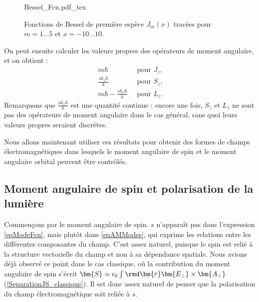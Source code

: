 \begin{figure}[!ht]
\centering
\def\svgwidth{0.8\columnwidth}
{Bessel_Fcn.pdf_tex}
\caption{Fonctions de Bessel de première espèce $J_m(x)$ tracées pour $m=1\ldots5$ et $x=-10\ldots10$.}
\label{Fig:BesselFcn}
\end{figure}

On peut ensuite calculer les valeurs propres des opérateurs de moment angulaire, et on obtient :
\begin{equation}
\begin{alignedat}{1}
m\hbar ~&\mbox{ pour } J_z\mbox{,}\\
\frac{sk_z\hbar}{k} ~&\mbox{ pour } S_z\mbox{,}\\
m\hbar-\frac{sk_z\hbar}{k} ~&\mbox{ pour } L_z\mbox{.}
\end{alignedat}
\label{eq.VP_AM}
\end{equation}
Remarquons que $\frac{sk_z\hbar}{k}$ est une quantité continue : encore une fois, $S_z$ et $L_z$ ne sont pas des opérateurs de moment angulaire dans le cas général, sans quoi leurs valeurs propres seraient discrètes. 


Nous allons maintenant utiliser ces résultats pour obtenir des formes de champs électromagnétiques dans lesquels le moment angulaire de spin et le moment angulaire orbital peuvent être contrôlés.

\subsection{Moment angulaire de spin et polarisation de la lumière}
Commençons par le moment angulaire de spin. $s$ n'apparaît pas dans l'expression \ref{eqModeFcn}, mais plutôt dans \ref{eqAMModes}, qui exprime les relations entre les différentes composantes du champ. C'est assez naturel, puisque le spin est relié à la structure vectorielle du champ et non à sa dépendance spatiale. Nous avions déjà observé ce point dans le cas classique, où la contribution du moment angulaire de spin s'écrit $\bm{S}=\epsilon_0\int{\rmd\bm{r}\bm{E_{\bot}}\times\bm{A_{\bot}}}$ (\ref{SeparationJS_classique}). Il est donc assez naturel de penser que la polarisation du champ électromagnétique soit reliée à $s$.

